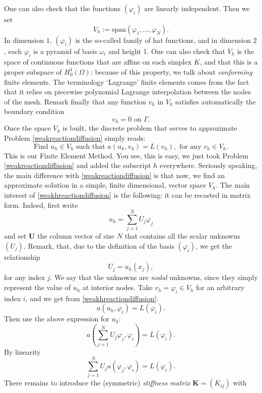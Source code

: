 \documentclass{article}
\begin{document}
One can also check that the functions $(\varphi_i)$ are linearly independent. Then we set
\[
V_h := \mathrm{span} ( \varphi_1 , \ldots , \varphi_N ).
\]
In dimension $1$, $(\varphi_i)$ is the so-called family of hat functions, and in dimension $2$, each $\varphi_i$ is a pyramid of basis $\omega_i$ and height 1. One can also check that $V_h$ is the space of continuous functions that are affine on each simplex $K$, and that this is a proper subspace of $H^1_0(\Omega)$: because of this property, we talk about \emph{conforming} finite elements. The terminology `Lagrange' finite elements comes from the fact that it relies on piecewise polynomial Lagrange interpolation between the nodes of the mesh. Remark finally that any function $v_h$ in $V_h$ satisfies automatically the boundary condition
\[
v_h = 0 \textrm{ on } \Gamma.
\]
Once the space $V_h$ is built, the discrete problem that serves to approximate Problem \eqref{weakreactiondiffusion} simply reads:
\begin{equation}
    \label{weakhreactiondiffusion}
    \textrm{Find } u_h \in V_h
    \textrm{ such that } a(u_h,v_h)=L(v_h),
    \textrm{ for any } v_h\in V_h. 
\end{equation}
This is our Finite Element Method. 
You see, this is easy, we just took Problem \eqref{weakreactiondiffusion} and added the subscript $h$ everywhere.
Seriously speaking, the main difference with \eqref{weakreactiondiffusion} is that now, we find an approximate solution in a simple, finite dimensional, vector space $V_h$.
The main interest of \eqref{weakhreactiondiffusion} is the following: it can be recasted in matrix form. Indeed, first write
\[
u_h = \sum_{j=1}^N U_j \varphi_j
\]
and set $\mathbf{U}$ the column vector of size $N$ that contains all the scalar unknowns $(U_j)$. Remark, that, due to the definition of the basis $(\varphi_i)$, we get the relationship
\[
U_j = u_h(x_j),
\]
for any index $j$. We say that the unknowns are \emph{nodal} unknowns, since they simply represent the value of $u_h$ at interior nodes.
Take $v_h = \varphi_i \in V_h$ for an arbitrary index $i$, and we get from \eqref{weakhreactiondiffusion}:
\[
 a(u_h,\varphi_i)=L(\varphi_i).
\]
Then use the above expression for $u_h$:
\[
a\left (\sum_{j=1}^N U_j \varphi_j,\varphi_i \right )=L(\varphi_i).
\]
By linearity
\begin{equation}
\label{matrixFEM1}
\sum_{j=1}^N U_j a\left ( \varphi_j,\varphi_i \right )=L(\varphi_i).
\end{equation}
There remains to introduce the (symmetric) \emph{stiffness matrix} $\mathbf{K} = (K_{ij})$ with
\end{document}
